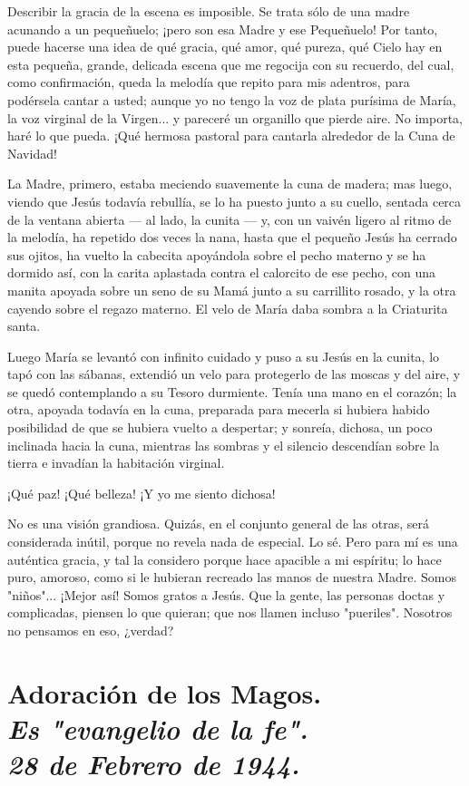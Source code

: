 \documentclass[12pt]{book} %
\begin{document}
Describir la gracia de la escena es imposible. Se trata sólo de una madre acunando a un pequeñuelo; ¡pero son esa Madre y ese Pequeñuelo! Por tanto, puede hacerse una idea de qué gracia, qué amor, qué pureza, qué Cielo hay en esta pequeña, grande, delicada escena que me regocija con su recuerdo, del cual, como confirmación, queda la melodía que repito para mis adentros, para podérsela cantar a usted; aunque yo no tengo la voz de plata purísima de María, la voz virginal de la Virgen... y pareceré un organillo que pierde aire. No importa, haré lo que pueda. ¡Qué hermosa pastoral para cantarla alrededor de la Cuna de Navidad! 

La Madre, primero, estaba meciendo suavemente la cuna de madera; mas luego, viendo que Jesús todavía rebullía, se lo ha puesto junto a su cuello, sentada cerca de la ventana abierta — al lado, la cunita — y, con un vaivén ligero al ritmo de la melodía, ha repetido dos veces la nana, hasta que el pequeño Jesús ha cerrado sus ojitos, ha vuelto la cabecita apoyándola sobre el pecho materno y se ha dormido así, con la carita aplastada contra el calorcito de ese pecho, con una manita apoyada sobre un seno de su Mamá junto a su carrillito rosado, y la otra cayendo sobre el regazo materno. El velo de María daba sombra a la Criaturita santa. 

Luego María se levantó con infinito cuidado y puso a su Jesús en la cunita, lo tapó con las sábanas, extendió un velo para protegerlo de las moscas y del aire, y se quedó contemplando a su Tesoro durmiente. Tenía una mano en el corazón; la otra, apoyada todavía en la cuna, preparada para mecerla si hubiera habido posibilidad de que se hubiera vuelto a despertar; y sonreía, dichosa, un poco inclinada hacia la cuna, mientras las sombras y el silencio descendían sobre la tierra e invadían la habitación virginal. 

¡Qué paz! ¡Qué belleza! ¡Y yo me siento dichosa! 

No es una visión grandiosa. Quizás, en el conjunto general de las otras, será considerada inútil, porque no revela nada de especial. Lo sé. Pero para mí es una auténtica gracia, y tal la considero porque hace apacible a mi espíritu; lo hace puro, amoroso, como si le hubieran recreado las manos de nuestra Madre. Somos "niños"... ¡Mejor así! Somos gratos a Jesús. Que la gente, las personas doctas y complicadas, piensen lo que quieran; que nos llamen incluso "pueriles". Nosotros no pensamos en eso, ¿verdad? 

\chapter*{Adoración de los Magos. \\ \normalfont\normalsize\textit{Es "evangelio de la fe". \\ 28 de Febrero de 1944.}}
\end{document}

